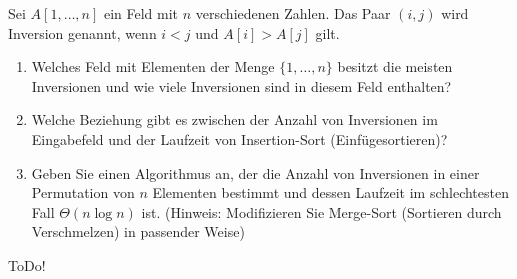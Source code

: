 
\begin{exercise}

Sei $A[1,\dots,n]$ ein Feld mit $n$ verschiedenen Zahlen. Das Paar $(i,j)$ wird Inversion genannt,
wenn $i < j$ und $A[i] > A[j]$ gilt.

\begin{enumerate}[label = (\alph*)]
  \item Welches Feld mit Elementen der Menge $\{1,\dots, n\}$ besitzt die meisten Inversionen und
  wie viele Inversionen sind in diesem Feld enthalten?
  \item Welche Beziehung gibt es zwischen der Anzahl von Inversionen im Eingabefeld und der Laufzeit
  von Insertion-Sort (Einfügesortieren)?
  \item Geben Sie einen Algorithmus an, der die Anzahl von Inversionen in einer Permutation von
  $n$ Elementen bestimmt und dessen Laufzeit im schlechtesten Fall $\Theta(n \log n)$ ist.
  (Hinweis: Modifizieren Sie Merge-Sort (Sortieren durch Verschmelzen) in passender Weise)
\end{enumerate}

\end{exercise}


\begin{solution}

ToDo!

\end{solution}

